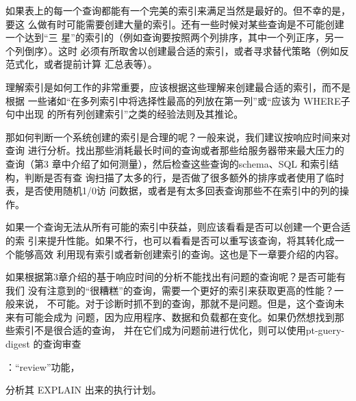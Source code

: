 如果表上的每一个查询都能有一个完美的索引来满足当然是最好的。但不幸的是，要这
么做有时可能需要创建大量的索引。还有一些时候对某些查询是不可能创建一个达到“三
星”的索引的（例如查询要按照两个列排序，其中一个列正序，另一个列倒序）。这时
必须有所取舍以创建最合适的索引，或者寻求替代策略（例如反范式化，或者提前计算
汇总表等）。

理解索引是如何工作的非常重要，应该根据这些理解来创建最合适的索引，而不是根据
一些诸如“在多列索引中将选择性最高的列放在第一列”或“应该为 WHERE子句中出现
的所有列创建索引”之类的经验法则及其推论。

那如何判断一个系统创建的索引是合理的呢？一般来说，我们建议按响应时间来对查询
进行分析。找出那些消耗最长时间的查询或者那些给服务器带来最大压力的查询（第3
章中介绍了如何测量），然后检查这些查询的schema、SQL 和索引结构，判断是否有查
询扫描了太多的行，是否做了很多额外的排序或者使用了临时表，是否使用随机1/0访
问数据，或者是有太多回表查询那些不在索引中的列的操作。

如果一个查询无法从所有可能的索引中获益，则应该看看是否可以创建一个更合适的索
引来提升性能。如果不行，也可以看看是否可以重写该查询，将其转化成一个能够高效
利用现有索引或者新创建索引的查询。这也是下一章要介绍的内容。

如果根据第3章介绍的基于响应时间的分析不能找出有问题的查询呢？是否可能有我们
没有注意到的“很糟糕”的查询，需要一个更好的索引来获取更高的性能？一般来说，
不可能。对于诊断时抓不到的查询，那就不是问题。但是，这个查询未来有可能会成为
问题，因为应用程序、数据和负载都在变化。如果仍然想找到那些索引不是很合适的查询，
并在它们成为问题前进行优化，则可以使用pt-guery-digest 的查询审查

：“review”功能，

分析其 EXPLAIN 出来的执行计划。


